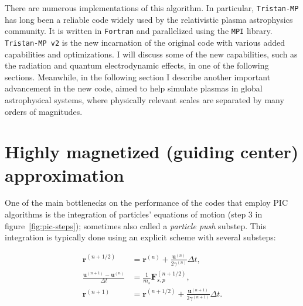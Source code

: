 There are numerous implementations of this algorithm. In particular, \texttt{Tristan-MP} \citep{2005AIPC..801..345S} has long been a reliable code widely used by the relativistic plasma astrophysics community. It is written in \texttt{Fortran} and parallelized using the \texttt{MPI} library. \texttt{Tristan-MP v2} \citep{tristanv2} is the new incarnation of the original code with various added capabilities and optimizations. I will discuss some of the new capabilities, such as the radiation and quantum electrodynamic effects, in one of the following sections. Meanwhile, in the following section I describe another important advancement in the new code, aimed to help simulate plasmas in global astrophysical systems, where physically relevant scales are separated by many orders of magnitudes.


\section{Highly magnetized (guiding center) approximation}
\label{sec:num-gca-approx}

One of the main bottlenecks on the performance of the codes that employ PIC algorithms is the integration of particles' equations of motion (step 3 in figure~\ref{fig:pic-steps}); sometimes also called a \emph{particle push} substep. This integration is typically done using an explicit scheme with several substeps:

\begin{align}
  \bm{r}^{(n+1/2)} &= \bm{r}^{(n)} + \frac{\bm{u}^{(n)}}{2\gamma^{(n)}}\Delta t,\\
  \frac{\bm{u}^{(n+1)}-\bm{u}^{(n)}}{\Delta t} &= \frac{1}{m_s} \bm{F}_{s,p}^{(n+1/2)},\label{eq:part-push2}\\
  \bm{r}^{(n+1)} &= \bm{r}^{(n+1/2)} + \frac{\bm{u}^{(n+1)}}{2\gamma^{(n+1)}}\Delta t.
\end{align}

